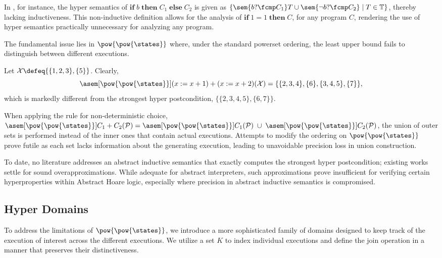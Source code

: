 In \cite{Mounir17}, for instance, the hyper semantics of $\bm{if} \; b \;
\bm{then} \; C_1 \; \bm{else} \; C_2$ is given as $\{ \sem{b ? \fcmp C_1} T
\cup \sem{\neg b ? \fcmp C_2} \mid T \in \mathbb{T}\}$, thereby lacking
inductiveness. This non-inductive definition allows for the analysis of
$\bm{if} \; 1 = 1 \; \bm{then} \; C$, for any program $C$, rendering the use of
hyper semantics practically unnecessary for analyzing any program.

The fundamental issue lies in $\pow{\pow{\states}}$ where, under the standard
powerset ordering, the least upper bound fails to distinguish between different
executions.

\begin{example}
  \label{exmp:determinism}
  Let $\mathcal{X} \defeq \{\{1, 2, 3\}, \{5\}\}$. Clearly,
  $$\asem[\pow{\pow{\states}}]{(x := x + 1) + (x := x + 2)}(\mathcal{X}) = 
  \{\{2, 3, 4\}, \{6\}, \{3, 4, 5\}, \{7\}\},$$
  which is markedly different from the strongest hyper postcondition, 
  $\{\{2, 3, 4, 5\}, \{6, 7\}\}$.
\end{example}

When applying the rule for non-deterministic choice,
$\asem[\pow{\pow{\states}}]{C_1 + C_2}(\mathcal{P}) =
\asem[\pow{\pow{\states}}]{C_1}(\mathcal{P}) \;\cup\;
\asem[\pow{\pow{\states}}]{C_2}(\mathcal{P})$, the union of outer sets is
performed instead of the inner ones that contain actual executions. Attempts to
modify the ordering on $\pow{\pow{\states}}$ prove futile as each set lacks
information about the generating execution, leading to unavoidable precision
loss in union construction.

To date, no literature addresses an abstract inductive semantics that exactly
computes the strongest hyper postcondition; existing works settle for sound
overapproximations. While adequate for abstract interpreters, such
approximations prove insufficient for verifying certain hyperproperties within
Abstract Hoare logic, especially where precision in abstract inductive
semantics is compromised.


\subsection{Hyper Domains}

To address the limitations of $\pow{\pow{\states}}$, we introduce a more
sophisticated family of domains designed to keep track of the execution of
interest across the different executions. We utilize a set $K$ to index
individual executions and define the join operation in a manner that preserves
their distinctiveness.

